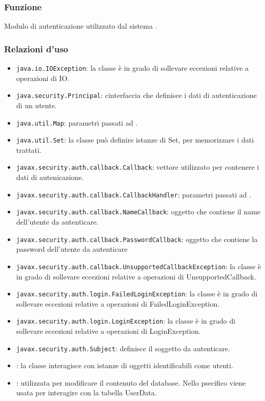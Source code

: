 
\subsubsection*{Funzione}
Modulo di autenticazione utilizzato dal sistema \caName.

\subsubsection*{Relazioni d'uso}
\begin{itemize}
	\item \texttt{java.io.IOException}: la classe è in grado di sollevare eccezioni relative a operazioni di IO.
	\item \texttt{java.security.Principal}: cinterfaccia che definisce i dati di autenticazione di un utente.
	\item \texttt{java.util.Map}: parametri passati ad .
	\item \texttt{java.util.Set}: la classe può definire istanze di Set, per memorizzare i dati trattati.
	\item \texttt{javax.security.auth.callback.Callback}: vettore utilizzato per contenere i dati di autenicazione.
	\item \texttt{javax.security.auth.callback.CallbackHandler}: parametri passati ad .
	\item \texttt{javax.security.auth.callback.NameCallback}: oggetto che contiene il name dell'utente da autenticare.
	\item \texttt{javax.security.auth.callback.PasswordCallback}: oggetto che contiene la password dell'utente da autenticare
	\item \texttt{javax.security.auth.callback.UnsupportedCallbackException}: la classe è in grado di sollevare eccezioni relative a operazioni di UnsupportedCallback.
	\item \texttt{javax.security.auth.login.FailedLoginException}: la classe è in grado di sollevare eccezioni relative a operazioni di FailedLoginException.
	\item \texttt{javax.security.auth.login.LoginException}: la classe è in grado di sollevare eccezioni relative a operazioni di LoginException.
	\item \texttt{javax.security.auth.Subject}: definisce il soggetto da autenticare.
	\item {}: la classe interagisce con istanze di oggetti identificabili come utenti.
	\item {}: utilizzata per modificare il contenuto del database. Nello psecifico viene usata per interagire con la tabella UserData.
\end{itemize}

